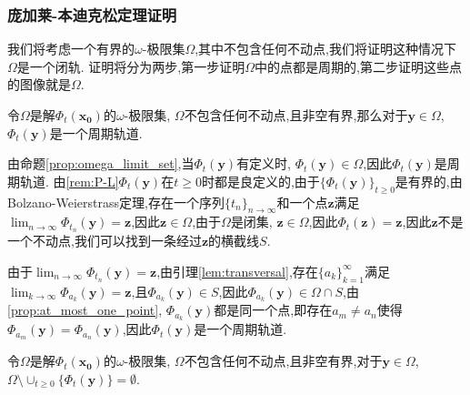 \subsubsection{庞加莱-本迪克松定理证明}

我们将考虑一个有界的$\omega$-极限集$\Omega$,其中不包含任何不动点,我们将证明这种情况下$\Omega$是一个闭轨. 证明将分为两步,第一步证明$\Omega$中的点都是周期的,第二步证明这些点的图像就是$\Omega$. 
\begin{prop}\label{prop:periodic_orbit}
    令$\Omega$是解$\Phi_t(\mathbf{x_0})$的$\omega$-极限集, $\Omega$不包含任何不动点,且非空有界,那么对于$\mathbf{y}\in \Omega$, $\Phi_t(\mathbf{y})$是一个周期轨道. 
\end{prop}
\begin{pf}
    由命题\ref{prop:omega_limit_set},当$\Phi_t(\mathbf{y})$有定义时, $\Phi_t(\mathbf{y})\in \Omega$,因此$\Phi_t(\mathbf{y})$是周期轨道. 由\ref{rem:P-L}$\Phi_t(\mathbf{y})$在$t\geq 0$时都是良定义的,由于$\{\Phi_t(\mathbf{y})\}_{t\geq 0}$是有界的,由Bolzano-Weierstrass定理,存在一个序列$\{t_n\}_{n\to\infty}$和一个点$\mathbf{z}$满足$\lim_{n\to\infty}\Phi_{t_n}(\mathbf{y})=\mathbf{z}$,因此$\mathbf{z}\in \Omega$,由于$\Omega$是闭集, $\mathbf{z}\in \Omega$,因此$\Phi_t(\mathbf{z})=\mathbf{z}$,因此$\mathbf{z}$不是一个不动点,我们可以找到一条经过$\mathbf{z}$的横截线$S$. 

    由于$\lim_{n\to\infty}\Phi_{t_n}(\mathbf{y})=\mathbf{z}$,由引理\ref{lem:transversal},存在$\{a_k\}_{k=1}^{\infty}$满足$\lim_{k\to\infty}\Phi_{a_k}(\mathbf{y})=\mathbf{z}$,且$\Phi_{a_k}(\mathbf{y})\in S$,因此$\Phi_{a_k}(\mathbf{y})\in \Omega\cap S$,由\ref{prop:at_most_one_point}, $\Phi_{a_k}(\mathbf{y})$都是同一个点,即存在$a_m\neq a_n$使得$\Phi_{a_m}(\mathbf{y})=\Phi_{a_n}(\mathbf{y})$,因此$\Phi_t(\mathbf{y})$是一个周期轨道. 
\end{pf}
\begin{prop}\label{prop:closed_orbit}
    令$\Omega$是解$\Phi_t(\mathbf{x_0})$的$\omega$-极限集, $\Omega$不包含任何不动点,且非空有界,对于$\mathbf{y}\in\Omega$, $\Omega\setminus\cup_{t\geq 0}\{\Phi_t(\mathbf{y})\}=\emptyset$. 
\end{prop}
